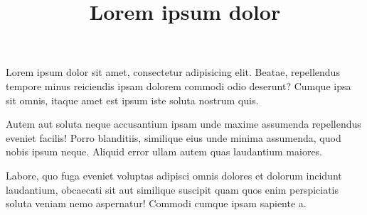\documentclass[a4paper]{article}
\title{Lorem ipsum dolor}
\begin{document}
\maketitle

Lorem ipsum dolor sit amet, consectetur adipisicing elit. Beatae, repellendus tempore minus reiciendis ipsam dolorem commodi odio deserunt? Cumque ipsa sit omnis, itaque amet est ipsum iste soluta nostrum quis.

Autem aut soluta neque accusantium ipsam unde maxime assumenda repellendus eveniet facilis! Porro blanditiis, similique eius unde minima assumenda, quod nobis ipsum neque. Aliquid error ullam autem quas laudantium maiores.

Labore, quo fuga eveniet voluptas adipisci omnis dolores et dolorum incidunt laudantium, obcaecati sit aut similique suscipit quam quos enim perspiciatis soluta veniam nemo aspernatur! Commodi cumque ipsam sapiente a.
\end{document}
